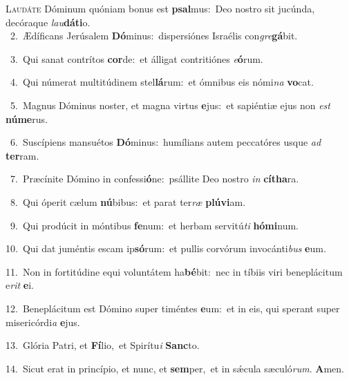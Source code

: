 \lettrine{\initial\textcolor{\initialcolor}{L}}{audáte} Dóminum quóniam bonus est \textbf{psal}\-mus:~\star Deo nostro sit jucúnda, decóraque \textit{lau}\-\textbf{dá}\textbf{ti}o.\\
{\numbfont\textcolor{\numbcolor}{~2.}}~Ædíficans Jerúsalem \textbf{Dó}\-minus:~\star dispersiónes Israélis con\-\textit{gre}\-\textbf{gá}bit.\par
{\numbfont\textcolor{\numbcolor}{~3.}}~Qui sanat contrítos \textbf{cor}\-de:~\star et álligat contritiónes \textit{e}\-\textbf{ó}rum.\par
{\numbfont\textcolor{\numbcolor}{~4.}}~Qui númerat multitúdinem stel\-\textbf{lá}\-rum:~\star et ómnibus eis nómi\textit{na} \textbf{vo}\-cat.\par
{\numbfont\textcolor{\numbcolor}{~5.}}~Magnus Dóminus noster, et magna virtus \textbf{e}\-jus:~\star et sapiéntiæ ejus non \textit{est} \textbf{nú}\-\textbf{me}rus.\par
{\numbfont\textcolor{\numbcolor}{~6.}}~Suscípiens mansuétos \textbf{Dó}\-minus:~\star humílians autem peccatóres usque \textit{ad} \textbf{ter}\-ram.\par
{\numbfont\textcolor{\numbcolor}{~7.}}~Præcínite Dómino in confessi\-\textbf{ó}\-ne:~\star psállite Deo nostro \textit{in} \textbf{cí}\-\textbf{tha}ra.\par
{\numbfont\textcolor{\numbcolor}{~8.}}~Qui óperit cælum \textbf{nú}\-bibus:~\star et parat ter\textit{ræ} \textbf{plú}\-\textbf{vi}am.\par
{\numbfont\textcolor{\numbcolor}{~9.}}~Qui prodúcit in móntibus \textbf{fe}\-num:~\star et herbam servitú\textit{ti} \textbf{hó}\-\textbf{mi}num.\par
{\numbfont\textcolor{\numbcolor}{10.}}~Qui dat juméntis escam ip\-\textbf{só}\-rum:~\star et pullis corvórum invocánti\textit{bus} \textbf{e}\-um.\par
{\numbfont\textcolor{\numbcolor}{11.}}~Non in fortitúdine equi voluntátem ha\-\textbf{bé}\-bit:~\star nec in tíbiis viri beneplácitum e\textit{rit} \textbf{e}\-i.\par
{\numbfont\textcolor{\numbcolor}{12.}}~Beneplácitum est Dómino super timéntes \textbf{e}\-um:~\star et in eis, qui sperant super misericórdi\textit{a} \textbf{e}\-jus.\par
{\numbfont\textcolor{\numbcolor}{13.}}~Glória Patri, et \textbf{Fí}\-lio,~\star et Spirítu\textit{i} \textbf{Sanc}\-to.\par
{\numbfont\textcolor{\numbcolor}{14.}}~Sicut erat in princípio, et nunc, et \textbf{sem}\-per,~\star et in sǽcula sæculó\-\textit{rum}\-. \textbf{A}\-men.\par
